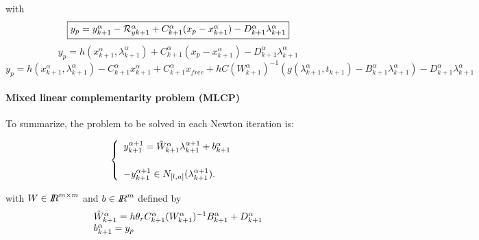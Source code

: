 with 
\begin{equation}
\fbox{$y_p = y^{\alpha}_{k+1} -\mathcal R^{\alpha}_{yk+1} + C^{\alpha}_{k+1}(x_p -x^{\alpha}_{k+1}) -
D^{\alpha}_{k+1} \lambda^{\alpha}_{k+1} $}
\end{equation}
\begin{equation}
y_p = h(x^{\alpha}_{k+1},\lambda^{\alpha}_{k+1}) + C^{\alpha}_{k+1}(x_p -x^{\alpha}_{k+1}) -
D^{\alpha}_{k+1} \lambda^{\alpha}_{k+1} 
\end{equation}
\begin{equation}
y_p = h(x^{\alpha}_{k+1},\lambda^{\alpha}_{k+1}) - C^{\alpha}_{k+1}x^{\alpha}_{k+1}
+C^{\alpha}_{k+1} x_{free} +hC(W^{\alpha}_{k+1})^{-1}(g(\lambda
^{\alpha}_{k+1},t_{k+1})-B^{\alpha}_{k+1} \lambda^{\alpha}_{k+1}) -
D^{\alpha}_{k+1} \lambda^{\alpha}_{k+1} 
\end{equation}

\paragraph{Mixed linear complementarity problem (MLCP)}To summarize, the problem to be solved in each Newton iteration is:\\{
  \begin{minipage}[l]{1.0\linewidth}
    \begin{equation}
      \begin{cases}
      \begin{array}[l]{l}
        y^{\alpha+1}_{k+1} =   \tilde W^{\alpha}_{k+1}  \lambda^{\alpha+1}_{k+1} + b^{\alpha}_{k+1}
        \\ \\
        -y^{\alpha+1}_{k+1} \in N_{[l,u]}(\lambda^{\alpha+1}_{k+1} ). 
      \end{array}
      \label{eq:NL14}
      \end{cases}
    \end{equation}
  \end{minipage}
}
with $W\in \mbox{\rm $I\!\!R$}^{m\times m}$ and $b\in\mbox{\rm $I\!\!R$}^{m}$ defined by
\begin{equation}
  \label{eq:NL15}
 \begin{array}[l]{l}
   \tilde W^{\alpha}_{k+1} = h \theta _r C^{\alpha}_{k+1} (W^{\alpha}_{k+1})^{-1}  B^{\alpha}_{k+1} + D^{\alpha}_{k+1} \\
   b^{\alpha}_{k+1} = y_p
\end{array}
\end{equation}

